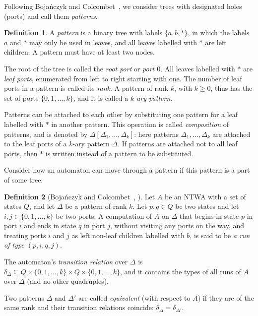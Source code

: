 \documentclass[12pt,a4paper]{article}
\theoremstyle{definition}
\newtheorem{definition}{Definition}
\begin{document}
Following Boja\'nczyk and Colcombet~\cite{BojanczykColcombet_reg},
we consider trees with designated holes (ports)
and call them \emph{patterns}.

\begin{definition}
A \emph{pattern} is a binary tree with labels $\{a,b,*\}$,
in which the labels $a$ and $*$ may only be used in leaves,
and all leaves labelled with $*$ are left children.
A pattern must have at least two nodes.

The root of the tree is called the \emph{root port} or \emph{port $0$}.
All leaves labelled with $*$ are \emph{leaf ports},
enumerated from left to right starting with one.
The number of leaf ports in a pattern is called its \emph{rank}.
A pattern of rank $k$, with $k \geqslant 0$,
thus has the set of ports $\{0, 1, \ldots, k\}$,
and it is called a \emph{$k$-ary pattern}.
\end{definition}

Patterns can be attached to each other
by substituting one pattern for a leaf labelled with $*$ in another pattern.
This operation is called \emph{composition} of patterns,
and is denoted by $\Delta[\Delta_1, \ldots,\Delta_k]$:
here patterns $\Delta_1, \ldots,\Delta_k$ are attached to the leaf ports of a $k$-ary pattern $\Delta$.
If patterns are attached not to all leaf ports,
then $*$ is written instead of a pattern to be substituted.

Consider how an automaton can move through a pattern
if this pattern is a part of some tree.

\begin{definition}[Boja\'nczyk and Colcombet~{\cite[Defn.~3]{BojanczykColcombet_det}}, {\cite[Defn.~3]{BojanczykColcombet_reg}}]
Let $A$ be an NTWA with a set of states $Q$,
and let $\Delta$ be a pattern of rank $k$.
Let $p,q \in Q$ be two states and let $i,j \in \{0, 1, \ldots, k\}$ be two ports.
A computation of $A$ on $\Delta$
that begins in state $p$ in port $i$
and ends in state $q$ in port $j$,
without visiting any ports on the way,
and treating ports $i$ and $j$
as left non-leaf children labelled with $b$,
is said to be \emph{a run of type $(p,i,q,j)$}.

The automaton's \emph{transition relation} over $\Delta$
is $\delta_{\Delta} \subseteq Q \times \{0, 1, \ldots, k\} \times Q \times \{0, 1, \ldots, k\}$,
and it contains the types of all runs of $A$ over $\Delta$
(and no other quadruples).

Two patterns $\Delta$ and $\Delta'$ are called \emph{equivalent} (with respect to $A$)
if they are of the same rank
and their transition relations coincide: $\delta_{\Delta} = \delta_{\Delta'}$.
\end{definition}
\end{document}
